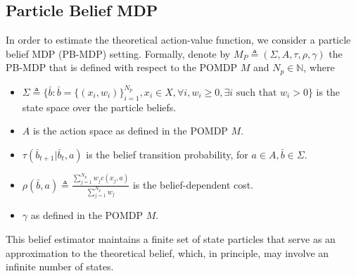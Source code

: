\documentclass[acmlarge, manuscript, screen, review, natbib=false, oneside]{acmart}
\begin{document}
\subsection{Particle Belief MDP }
In order to estimate the theoretical action-value function, we consider a particle belief MDP (PB-MDP) setting. Formally, denote by $M_P \triangleq (\Sigma, A, \tau, \rho, \gamma)$ the PB-MDP that is defined with respect to the POMDP $M$ \cite{lim2023optimality} and $N_p \in \mathbb{N}$, where 
\begin{itemize}
	\item $\Sigma \triangleq \{\bar{b}:\bar{b}=\{(x_i,w_i)\}_{i=1}^{N_p},x_i\in X, \forall i,w_i\geq 0,\exists i\text{ such that } w_i>0\}$ is the state space over the particle beliefs.
	\item $A$ is the action space as defined in the POMDP $M$.
	\item $\tau(\bar{b}_{t+1}|\bar{b}_{t}, a)$ is the belief transition probability, for $a\in A,\bar{b}\in \Sigma$.
	\item $\rho(\bar{b},a) \triangleq \frac{\sum_{j=1}^{N_p} w_j c(x_j,a)}{\sum_{j=1}^{N_p} w_j}$ is the belief-dependent cost.
	\item $\gamma$ as defined in the POMDP $M$.
\end{itemize}
This belief estimator maintains a finite set of state particles that serve as an approximation to the theoretical belief, which, in principle, may involve an infinite number of states.
\end{document}
